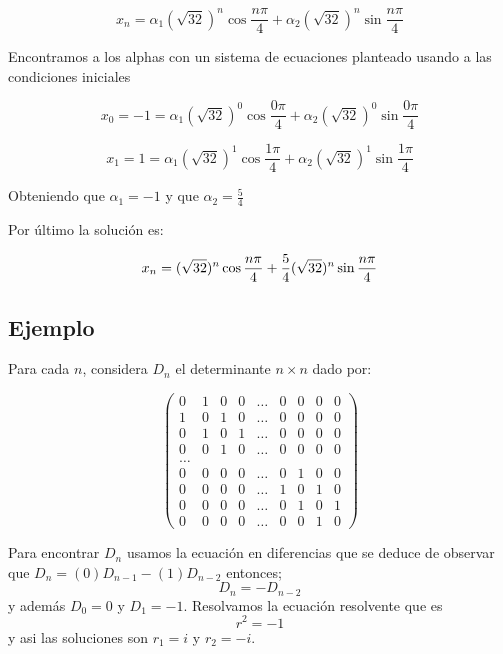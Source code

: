 \documentclass{report}
\begin{document}
  $$x_{n}=\alpha_{1}(\sqrt{32})^n\cos{\frac{n\pi}{4}} + \alpha_{2}(\sqrt{32})^n\sin{\frac{n\pi}{4}}$$

    Encontramos a los alphas con un sistema de ecuaciones planteado usando a las condiciones iniciales

    $$x_{0}=-1=\alpha_{1}(\sqrt{32})^0\cos{\frac{0\pi}{4}} + \alpha_{2}(\sqrt{32})^0\sin{\frac{0\pi}{4}}$$
      
     $$x_{1}=1=\alpha_{1}(\sqrt{32})^1\cos{\frac{1\pi}{4}} + \alpha_{2}(\sqrt{32})^1\sin{\frac{1\pi}{4}}$$

        Obteniendo que $\alpha_{1}=-1$ y que $\alpha_{2}=\frac{5}{4}$

        Por último la solución
 es:

         $$x_{n}=\-(\sqrt{32})^n\cos{\frac{n\pi}{4}} + \frac{5}{4}(\sqrt{32})^n\sin{\frac{n\pi}{4}}$$


\subsection{Ejemplo}

Para cada $n$, considera $D_{n}$ el determinante $n\times n$ dado por:

\begin{equation*}
\begin{pmatrix}
0 & 1 & 0 & 0 &\ldots & 0 & 0 & 0 & 0\\
1 & 0 & 1 & 0 &\ldots & 0 & 0 & 0 & 0\\
0 & 1 & 0 & 1 &\ldots & 0 & 0 & 0 & 0\\
0 & 0 & 1 & 0 &\ldots & 0 & 0 & 0 & 0\\
\ldots\\
0 & 0 & 0 & 0 &\ldots & 0 & 1 & 0 & 0\\
0 & 0 & 0 & 0 &\ldots & 1 & 0 & 1 & 0\\
0 & 0 & 0 & 0 &\ldots & 0 & 1 & 0 & 1\\
0 & 0 & 0 & 0 &\ldots & 0 & 0 & 1 & 0
\end{pmatrix}
\end{equation*}


Para encontrar $D_{n}$ usamos la ecuación en diferencias que se deduce de observar
que $D_{n}=(0)D_{n-1}-(1)D_{n-2}$ entonces;
\begin{equation}
  \label{determinante}
D_{n}=-D_{n-2}
\end{equation}
 y además $D_{0}=0$ y $D_{1}=-1$.
Resolvamos la ecuación resolvente que es $$r^{2}=-1$$ y asi las soluciones son $r_{1}=i$ y  $r_{2}=-i$.
\end{document}
